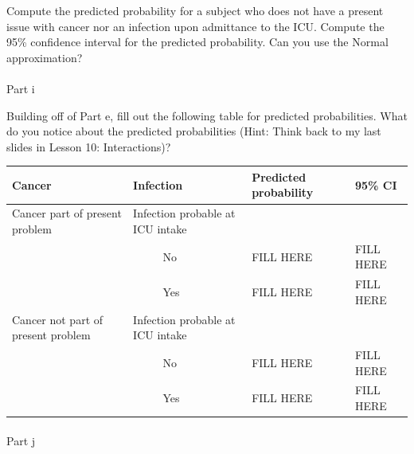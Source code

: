 \documentclass[
  letterpaper,
  DIV=11,
  numbers=noendperiod]{scrartcl}
\makeatletter
\let\oldparagraph\paragraph
\renewcommand{\paragraph}{
    \@ifstar
      \xxxParagraphStar
      \xxxParagraphNoStar
  }
\newcommand{\xxxParagraphStar}[1]{\oldparagraph*{#1}\mbox{}}
\newcommand{\xxxParagraphNoStar}[1]{\oldparagraph{#1}\mbox{}}
\makeatother
\begin{document}
Compute the predicted probability for a subject who does not have a
present issue with cancer nor an infection upon admittance to the ICU.
Compute the 95\% confidence interval for the predicted probability. Can
you use the Normal approximation?

\paragraph{Part i}\label{part-i}

Building off of Part e, fill out the following table for predicted
probabilities. What do you notice about the predicted probabilities
(Hint: Think back to my last slides in Lesson 10: Interactions)?

\begin{longtable}[]{@{}
  >{\raggedright\arraybackslash}p{}
  >{\raggedright\arraybackslash}p{}
  >{\raggedright\arraybackslash}p{}
  >{\raggedright\arraybackslash}p{}@{}}
\toprule\noalign{}
\begin{minipage}[b]{\linewidth}\raggedright
Cancer
\end{minipage} & \begin{minipage}[b]{\linewidth}\raggedright
Infection
\end{minipage} & \begin{minipage}[b]{\linewidth}\raggedright
Predicted probability
\end{minipage} & \begin{minipage}[b]{\linewidth}\raggedright
95\% CI
\end{minipage} \\
\midrule\noalign{}
\endhead
\bottomrule\noalign{}
\endlastfoot
Cancer part of present problem & Infection probable at ICU intake & & \\
& ~ ~ ~~No & FILL HERE & FILL HERE \\
& ~ ~ ~~Yes & FILL HERE & FILL HERE \\
Cancer not part of present problem & Infection probable at ICU intake &
& \\
& ~ ~ ~~No & FILL HERE & FILL HERE \\
& ~ ~ ~~Yes & FILL HERE & FILL HERE \\
\end{longtable}

\paragraph{Part j}\label{part-j}
\end{document}
